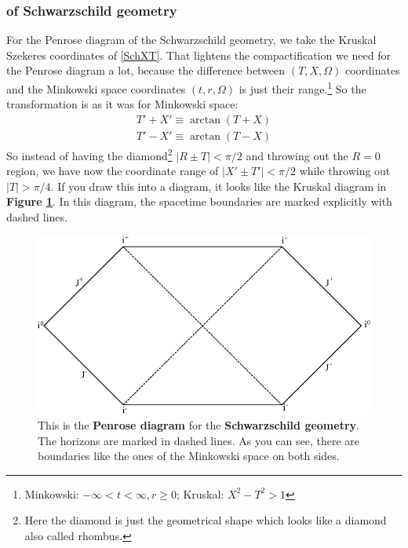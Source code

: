 	\subsubsection{of Schwarzschild geometry \checkmark}
	
	For the Penrose diagram of the Schwarzschild geometry, we take the Kruskal Szekeres coordinates of \eqref{SchXT}. That lightens the compactification we need for the Penrose diagram a lot, because the difference between $(T,X,\Omega)$ coordinates and the Minkowski space coordinates $(t,r,\Omega)$ is just their range.\footnote{Minkowski: $-\infty < t < \infty, r\geq 0$; Kruskal: $X^2-T^2 > 1$}
	So the transformation is as it was for Minkowski space:
		\begin{equation}
			\begin{split}
			T'+X'\equiv \arctan(T+X) \\
			T'-X'\equiv \arctan(T-X)
			\end{split}		
		\end{equation}
	So instead of having the diamond\footnote{Here the diamond is just the geometrical shape which looks like a diamond also called rhombus.} $|R \pm T| < \pi/2$ and throwing out the $R=0$ region, we have now the coordinate range of $|X'\pm T'|< \pi/2$ while throwing out $|T| > \pi/4$.  %
	If you draw this into a diagram, it looks like the Kruskal diagram in \textbf{Figure \ref{schpenrose}}. In this diagram, the spacetime boundaries are marked explicitly with dashed lines. 
		\begin{figure}[tbp]  	
	  	\begin{center}
		\includegraphics[scale=1]{schpenrose}
		\end{center}
		\caption{This is the \textbf{Penrose diagram} for the \textbf{Schwarzschild geometry}. The horizons are marked in dashed lines. As you can see, there are boundaries like the ones of the Minkowski space on both sides.} \label{schpenrose}
		\end{figure}
	\FloatBarrier

